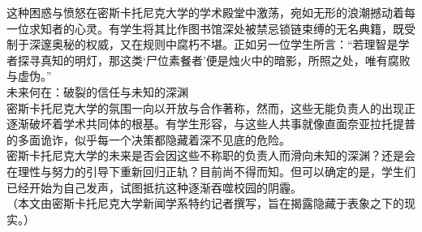 \documentclass[letterpaper, 12pt]{article}
\begin{document}
\begin{multicols}{2}
这种困惑与愤怒在密斯卡托尼克大学的学术殿堂中激荡，宛如无形的浪潮撼动着每一位求知者的心灵。有学生将其比作图书馆深处被禁忌锁链束缚的无名典籍，既受制于深邃奥秘的权威，又在规则中腐朽不堪。正如另一位学生所言：“若理智是学者探寻真知的明灯，那这类‘尸位素餐者’便是烛火中的暗影，所照之处，唯有腐败与虚伪。”\\

未来何在：破裂的信任与未知的深渊\\

密斯卡托尼克大学的氛围一向以开放与合作著称，然而，这些无能负责人的出现正逐渐破坏着学术共同体的根基。有学生形容，与这些人共事就像直面奈亚拉托提普的多面诡诈，似乎每一个决策都隐藏着深不见底的危险。\\

密斯卡托尼克大学的未来是否会因这些不称职的负责人而滑向未知的深渊？还是会在理性与努力的引导下重新回归正轨？目前尚不得而知。但可以确定的是，学生们已经开始为自己发声，试图抵抗这种逐渐吞噬校园的阴霾。\\

（本文由密斯卡托尼克大学新闻学系特约记者撰写，旨在揭露隐藏于表象之下的现实。）
\end{multicols} 
\end{document}
